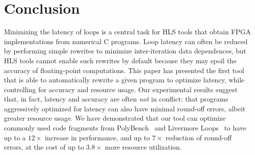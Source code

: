 \section{Conclusion}
\label{lo:sec:conclusion}

Minimizing the latency of loops is a central task for HLS tools that obtain
FPGA implementations from numerical C programs. Loop latency can often be
reduced by performing simple rewrites to minimize inter-iteration data
dependences, but HLS tools cannot enable such rewrites by default because
they may spoil the accuracy of floating-point computations. This paper has
presented the first tool that is able to automatically rewrite a given program
to optimize latency, while controlling for accuracy and resource usage. Our
experimental results suggest that, in fact, latency and accuracy are often
\emph{not} in conflict: that programs aggressively optimized for latency can
also have minimal round-off errors, albeit greater resource usage. We have
demonstrated that our tool can optimize commonly used code fragments from
PolyBench~\cite{polybench} and Livermore Loops~\cite{livermore} to have up to a
$12\times$ increase in performance, and up to $7\times$ reduction of round-off
errors, at the cost of up to $3.8\times$ more resource utilization.

